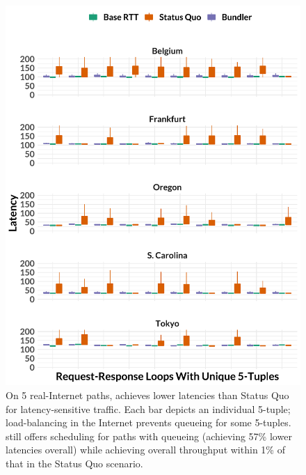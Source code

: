 \begin{figure}
    \centering
\begin{knitrout}
\color{fgcolor}
\includegraphics[width=\maxwidth]{figure/eval_realworld-1} 

\end{knitrout}
\newcommand{\realworldMedianLatencyImprovement}{57\%\xspace}
\newcommand{\realworldAvgBwRatio}{1\%\xspace}
\caption{On 5 real-Internet paths, \name achieves lower latencies than Status Quo for latency-sensitive traffic. Each bar depicts an individual 5-tuple; load-balancing in the Internet prevents queueing for some 5-tuples. \name still offers scheduling for paths with queueing (achieving \realworldMedianLatencyImprovement lower latencies overall) while achieving overall throughput within \realworldAvgBwRatio of that in the Status Quo scenario.}
    \label{fig:eval:realworld}
\end{figure}

\newcommand{\realworldMedianLatencyImprovement}{57\%\xspace}
\newcommand{\realworldAvgBwRatio}{1\%\xspace}
